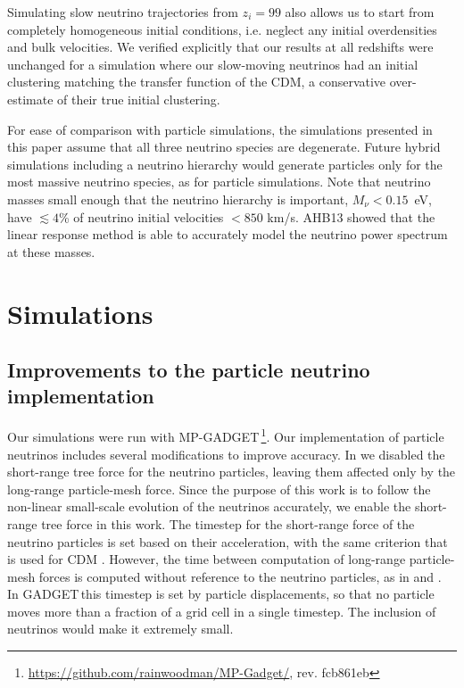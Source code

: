 \documentclass[useAMS, usenatbib]{mnras}
\newcommand{\gadget}{{\small GADGET\,}}
\begin{document}
Simulating slow neutrino trajectories from $z_i = 99$ also allows us to start from completely homogeneous initial conditions, i.e. neglect any initial overdensities and bulk velocities. We verified explicitly that our results at all redshifts were unchanged for a simulation where our slow-moving neutrinos had an initial clustering matching the transfer function of the CDM, a conservative over-estimate of their true initial clustering.

For ease of comparison with particle simulations, the simulations presented in this paper assume that all three neutrino species are degenerate. Future hybrid simulations including a neutrino hierarchy would generate particles only for the most massive neutrino species, as for particle simulations. Note that neutrino masses small enough that the neutrino hierarchy is important, $M_\nu < 0.15$~eV, have $\lesssim 4$\% of neutrino initial velocities $< 850$ km/s. AHB13 showed that the linear response method is able to accurately model the neutrino power spectrum at these masses.

\section{Simulations} \label{sec:simulations}


\subsection{Improvements to the particle neutrino implementation}
\label{sec:partnuimprovements}

Our simulations were run with MP-\gadget\footnote{\url{https://github.com/rainwoodman/MP-Gadget/}, rev. fcb861eb}. Our implementation of particle neutrinos includes several modifications to improve accuracy.
In \cite{Bird_2012} we disabled the short-range tree force for the neutrino particles, leaving them affected only by the long-range particle-mesh force. Since the purpose of this work is to follow the non-linear small-scale evolution of the neutrinos accurately, we enable the short-range tree force in this work. The timestep for the short-range force of the neutrino particles is set based on their acceleration, with the same criterion that is used for CDM \citep{Springel_2005}. However, the time between computation of long-range particle-mesh forces is computed without reference to the neutrino particles, as in \cite{Viel_2010} and \cite{Bird_2012}. In \gadget this timestep is set by particle displacements, so that no particle moves more than a fraction of a grid cell in a single timestep. The inclusion of neutrinos would make it extremely small.
\end{document}
